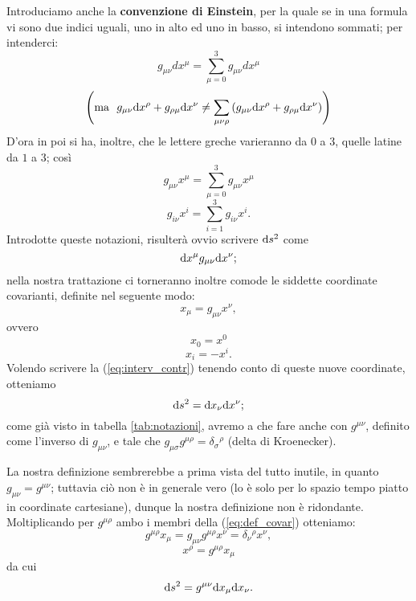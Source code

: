 Introduciamo anche la \textbf{convenzione di Einstein}, per la quale se in una formula vi sono due indici uguali,
uno in alto ed uno in basso, si intendono sommati; per intenderci: 
\begin{equation}
g_{\mu\nu}dx^{\mu}=\sum_{\mu=0}^{3}g_{\mu\nu}dx^{\mu}
\end{equation}
\begin{equation}
 \left(\mbox{ma \,\,} g_{\mu \nu} \mathrm{d} x^{\rho} + g_{\rho \mu} \mathrm{d}
x^{\nu} \neq \sum _{\mu \nu \rho} \left( g_{\mu \nu} \mathrm{d} x^{\rho} +
g_{\rho \mu} \mathrm{d} x^{\nu} \right)\right)
\end{equation} 
D'ora in poi si ha, inoltre, che le lettere greche varieranno da $0$ a
$3$, quelle latine da $1$ a $3$; cos\`i
\begin{equation}
 g_{\mu \nu} x^{\mu} = \sum_{\mu = 0 }^{ 3 } g_{\mu \nu}
x^{\mu} 
\end{equation} 
\begin{equation}
g_{i \nu} x^{i} = \sum_{i = 1 }^{ 3 } g_{i \nu} x^{i}.
\end{equation}
Introdotte queste notazioni, risulter\`a ovvio scrivere $\mathrm{d} s^2$ come
\begin{equation}
\mathrm{d} x^{\mu}g_{\mu\nu}\mathrm{d} x^{\nu};
\label{eq:interv_contr}
\end{equation}
nella nostra trattazione ci torneranno inoltre comode le siddette
coordinate covarianti, definite nel seguente modo:
\begin{equation}
x_{\mu} = g_{\mu\nu} x^{\nu},
\label{eq:def_covar}
\end{equation}
ovvero 
\begin{equation}
x_0 = x^0 
\end{equation}
\begin{equation}
x_i = - x^i.  
\end{equation}
Volendo scrivere la (\ref{eq:interv_contr}) tenendo conto di queste
nuove coordinate, otteniamo 
$$ \mathrm{d} s^2 = \mathrm{d} x_{\nu} \mathrm{d} x^{\nu}; $$
come gi\`a visto in tabella \vref{tab:notazioni}, avremo a che fare
anche con $g^{\mu\nu}$, definito come l'inverso di $g_{\mu\nu}$, e tale
che $g_{\mu \sigma} g^{\mu \rho} = \delta_{\sigma}{}^{\rho}$ (delta di
Kroenecker).

La nostra definizione sembrerebbe a prima vista del tutto inutile, in
quanto $g_{\mu \nu} = g^{\mu \nu}$; tuttavia ci\`o non \`e in generale
vero (lo \`e solo per lo spazio tempo piatto in coordinate cartesiane),
dunque la nostra definizione non \`e ridondante.  \newline Moltiplicando
per $g^{\mu \rho}$ ambo i membri della (\ref{eq:def_covar}) otteniamo:
\begin{equation}
 g^{\mu \rho} x_{\mu} = g_{\mu \nu} g^{\mu \rho} x^{\nu} = 
\delta_{\nu}{}^{\rho} x^{\nu}, 
\end{equation}
\begin{equation}
 x^{\rho} = g^{\mu \rho} x_{\mu}
\end{equation} 
da cui 
\begin{equation}
\mathrm{d} s^2 = g^{\mu
\nu}\mathrm{d} x_{\mu} \mathrm{d} x_{\nu}.
\end{equation}

